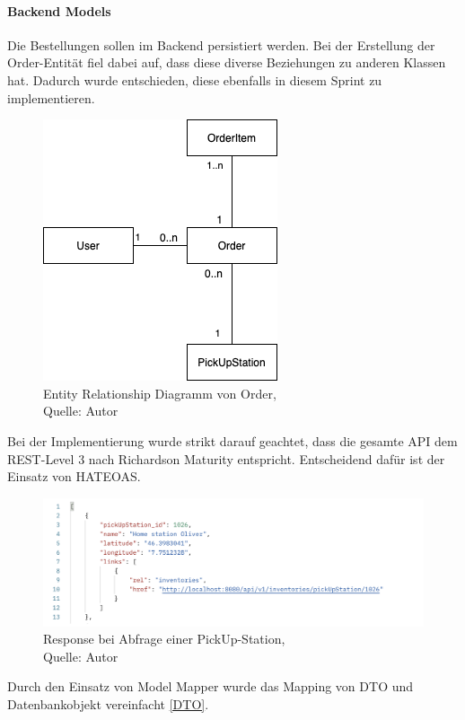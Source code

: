 \paragraph{Backend Models}
Die Bestellungen sollen im Backend persistiert werden. Bei der Erstellung der Order-Entität fiel dabei auf, dass diese diverse Beziehungen zu anderen Klassen hat. Dadurch wurde entschieden, diese ebenfalls in diesem Sprint zu implementieren. 
 \begin{figure}[H]
	\centering
	\includegraphics[scale=0.5]{images/erdOrder.PNG}
	\caption[Entity Relationship Diagramm von Order]{Entity Relationship Diagramm von Order,\\ Quelle: Autor}
	\label{img: erdOrder}
\end{figure} 
\newpage
Bei der Implementierung wurde strikt darauf geachtet, dass die gesamte API dem REST-Level 3 nach Richardson Maturity entspricht. Entscheidend dafür ist der Einsatz von \ac{HATEOAS}. 
 \begin{figure}[H]
	\centering
	\includegraphics[scale=0.5]{images/pickUpJSON.PNG}
	\caption[Response bei Abfrage einer PickUp-Station]{Response bei Abfrage einer PickUp-Station,\\ Quelle: Autor}
	\label{img: responseRequest}
\end{figure} 

Durch den Einsatz von Model Mapper wurde das Mapping von \ac{DTO} und Datenbankobjekt vereinfacht \ref{DTO}. 

